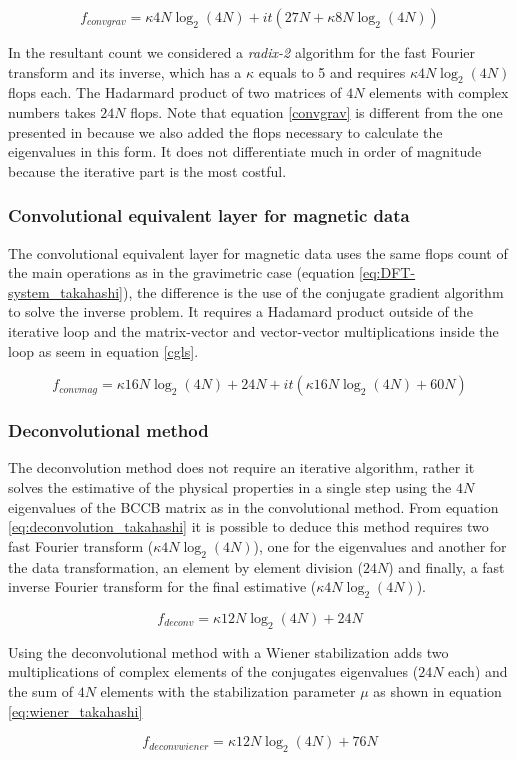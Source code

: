 \begin{equation}
	f_{convgrav} = \kappa4N\log_2(4N) + it(27N + \kappa8N\log_2(4N))
\label{convgrav}
\end{equation}

In the resultant count we considered a \textit{radix-2} algorithm for the fast Fourier transform and its inverse, which has a $\kappa$ equals to 5 and requires $\kappa4N\log_2(4N)$ flops each. The Hadarmard product of two matrices of $4N$ elements with complex numbers takes $24N$ flops. Note that equation \ref{convgrav} is different from the one presented in \cite{takahashi2020} because we also added the flops necessary to calculate the  eigenvalues in this form. It does not differentiate much in order of magnitude because the iterative part is the most costful.

\subsubsection{Convolutional equivalent layer for magnetic data \citep{takahashi2022}}

The convolutional equivalent layer for magnetic data uses the same flops count of the main operations as in the gravimetric case (equation \ref{eq:DFT-system_takahashi}), the difference is the use of the conjugate gradient algorithm to solve the inverse problem.
It requires a Hadamard product outside of the iterative loop and the matrix-vector and vector-vector multiplications inside the loop as seem in equation \ref{cgls}.

\begin{equation}
	f_{convmag} = \kappa16N\log_2(4N) + 24N + it(\kappa16N\log_2(4N) + 60N)
\label{convmag}
\end{equation}

\subsubsection{Deconvolutional method}

The deconvolution method does not require an iterative algorithm, rather it solves the estimative of the physical properties in a single step using the $4N$ eigenvalues of the BCCB matrix as in the convolutional method. From equation \ref{eq:deconvolution_takahashi} it is possible to deduce this method requires two fast Fourier transform ($\kappa4N\log_2(4N)$), one for the eigenvalues and another for the data transformation, an element by element division ($24N$) and finally, a fast inverse Fourier transform for the final estimative ($\kappa4N\log_2(4N)$).

\begin{equation}
	f_{deconv} = \kappa12N\log_2(4N) + 24N
	\label{deconv}
\end{equation}

Using the deconvolutional method with a Wiener stabilization adds two multiplications of complex elements of the conjugates eigenvalues ($24N$ each) and the sum of $4N$ elements with the stabilization parameter $\mu$ as shown in equation \ref{eq:wiener_takahashi}

\begin{equation}
	f_{deconvwiener} = \kappa12N\log_2(4N) + 76N
	\label{deconvwiener}
\end{equation}
